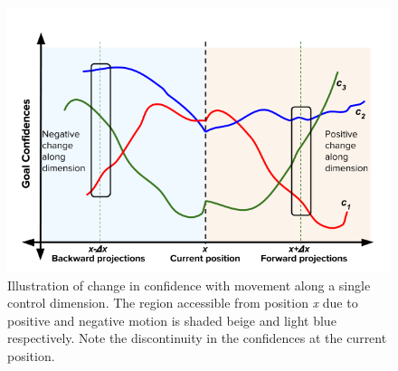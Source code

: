 \documentclass[conference]{IEEEtran}
\begin{document}
%

\begin{figure}
	\includegraphics[width = 1\hsize, height = 0.26\vsize]{./figures/DisambMetric.png}
	\vspace{-0.4cm}
	\caption{Illustration of change in confidence with movement along a single control dimension. The region accessible from position \textit{x} due to positive and negative motion is shaded beige and light blue respectively. Note the discontinuity in the confidences at the current position.}
	\label{DM_FIG}
\end{figure}
\end{document}
